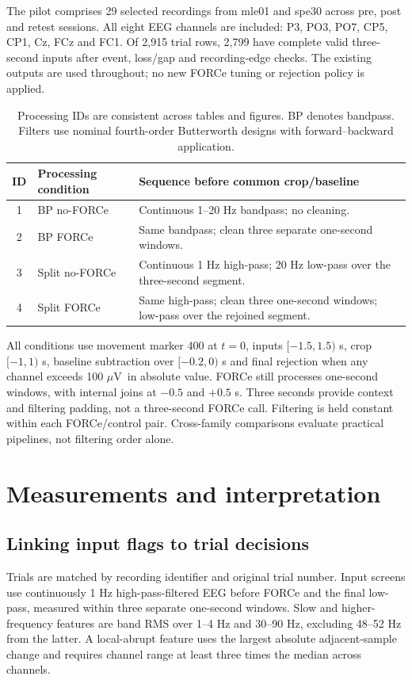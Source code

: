 \documentclass[11pt,a4paper]{article}
\newcommand{\uv}{\ensuremath{\mu\mathrm{V}}}
\begin{document}
The pilot comprises 29 selected recordings from mle01 and spe30 across pre, post and retest sessions. All eight EEG channels are included: P3, PO3, PO7, CP5, CP1, Cz, FCz and FC1. Of 2,915 trial rows, 2,799 have complete valid three-second inputs after event, loss/gap and recording-edge checks. The existing outputs are used throughout; no new FORCe tuning or rejection policy is applied.
\begin{table}[H]\centering\small
\begin{tabularx}{\linewidth}{@{}clX@{}}\toprule
ID & Processing condition & Sequence before common crop/baseline\\\midrule
1 & BP no-FORCe & Continuous 1--20 Hz bandpass; no cleaning.\\[3pt]
2 & BP FORCe & Same bandpass; clean three separate one-second windows.\\[3pt]
3 & Split no-FORCe & Continuous 1 Hz high-pass; 20 Hz low-pass over the three-second segment.\\[3pt]
4 & Split FORCe & Same high-pass; clean three one-second windows; low-pass over the rejoined segment.\\\bottomrule
\end{tabularx}
\caption{Processing IDs are consistent across tables and figures. BP denotes bandpass. Filters use nominal fourth-order Butterworth designs with forward--backward application.}\label{tab:conditions}
\end{table}
All conditions use movement marker 400 at $t=0$, inputs $[-1.5,1.5)$ s, crop $[-1,1)$ s, baseline subtraction over $[-0.2,0)$ s and final rejection when any channel exceeds 100 \uv\ in absolute value. FORCe still processes one-second windows, with internal joins at $-0.5$ and $+0.5$ s. Three seconds provide context and filtering padding, not a three-second FORCe call. Filtering is held constant within each FORCe/control pair. Cross-family comparisons evaluate practical pipelines, not filtering order alone.
\clearpage
\section{Measurements and interpretation}
\subsection{Linking input flags to trial decisions}
Trials are matched by recording identifier and original trial number. Input screens use continuously 1 Hz high-pass-filtered EEG before FORCe and the final low-pass, measured within three separate one-second windows. Slow and higher-frequency features are band RMS over 1--4 Hz and 30--90 Hz, excluding 48--52 Hz from the latter. A local-abrupt feature uses the largest absolute adjacent-sample change and requires channel range at least three times the median across channels.
\end{document}
